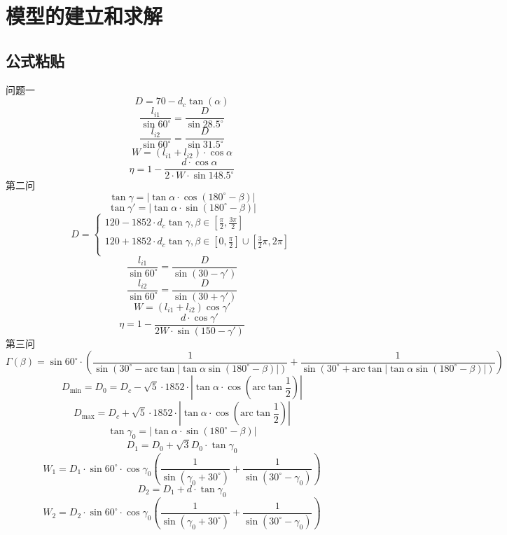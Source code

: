 \documentclass[withoutpreface,bwprint]{cumcmthesis} %
\begin{document}
\section{模型的建立和求解}
\subsection{公式粘贴}
问题一
$$
D=70-d_c\tan \left( \alpha \right) 
$$ 
$$
\frac{l_{i1}}{\sin 60^{\circ}}=\frac{D}{\sin 28.5^{\circ}}
$$ 
$$
\frac{l_{i2}}{\sin 60^{\circ}}=\frac{D}{\sin 31.5^{\circ}}
$$ 
$$
W=\left( l_{i1}+l_{i2} \right) \cdot \cos \alpha 
$$ 
$$
\eta =1-\frac{d\cdot \cos \alpha}{2\cdot W\cdot \sin 148.5^{\circ}}
$$ 
第二问
$$
\tan \gamma =\left| \tan \alpha \cdot \cos \left( 180^{\circ}-\beta \right) \right|
$$ 
$$
\tan \gamma \prime=\left| \tan \alpha \cdot \sin \left( 180^{\circ}-\beta \right) \right|
$$ 
$$
D=\begin{cases}
	120-1852\cdot d_c\tan \gamma , \beta \in \left[ \frac{\pi}{2},\frac{3\pi}{2} \right]\\
	120+1852\cdot d_c\tan \gamma , \beta \in \left[ 0,\frac{\pi}{2} \right] \cup \left[ \frac{3}{2}\pi ,2\pi \right]\\
\end{cases}
$$ 
$$
\frac{l_{i1}}{\sin 60^{\circ}}=\frac{D}{\sin \left( 30-\gamma \prime \right)}
$$ 
$$
\frac{l_{i2}}{\sin 60^{\circ}}=\frac{D}{\sin \left( 30+\gamma \prime \right)}
$$ 
$$
W=\left( l_{i1}+l_{i2} \right) \cos \gamma \prime
$$ 
$$
\eta =1-\frac{d\cdot \cos \gamma \prime}{2W\cdot \sin \left( 150-\gamma \prime \right)}
$$ 
第三问
$$
\varGamma \left( \beta \right) =\sin 60^{\circ}\cdot \left( \frac{1}{\sin \left( 30^{\circ}-\mathrm{arc}\tan \left| \tan \alpha \sin \left( 180^{\circ}-\beta \right) \right| \right)}+\frac{1}{\sin \left( 30^{\circ}+\mathrm{arc}\tan \left| \tan \alpha \sin \left( 180^{\circ}-\beta \right) \right| \right)} \right) 
$$
$$
D_{\min}=D_0=D_c-\sqrt{5}\cdot 1852\cdot \left| \tan \alpha \cdot \cos \left( \mathrm{arc}\tan \frac{1}{2} \right) \right|
$$
$$
D_{\max}=D_c+\sqrt{5}\cdot 1852\cdot \left| \tan \alpha \cdot \cos \left( \mathrm{arc}\tan \frac{1}{2} \right) \right|
$$
$$
\tan \gamma _0=\left| \tan \alpha \cdot \sin \left( 180^{\circ}-\beta \right) \right|
$$
$$
D_1=D_0+\sqrt{3}D_0\cdot \tan \gamma _0
$$
$$
W_1=D_1\cdot \sin 60^{\circ}\cdot \cos \gamma _0\left( \frac{1}{\sin \left( \gamma _0+30^{\circ} \right)}+\frac{1}{\sin \left( 30^{\circ}-\gamma _0 \right)} \right) 
$$
$$
D_2=D_1+d\cdot \tan \gamma _0
$$
$$
W_2=D_2\cdot \sin 60^{\circ}\cdot \cos \gamma _0\left( \frac{1}{\sin \left( \gamma _0+30^{\circ} \right)}+\frac{1}{\sin \left( 30^{\circ}-\gamma _0 \right)} \right) 
$$
\end{document}
